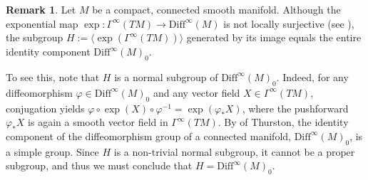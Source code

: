 \documentclass[11pt,reqno]{amsart}
\theoremstyle{definition}
\newtheorem{remark}[theorem]{Remark}
\numberwithin{equation}{section}
\begin{document}
\begin{remark}
Let $M$ be a compact, connected smooth manifold. Although the exponential map $\exp: \Gamma^\infty(TM) \to \mathrm{Diff}^\infty(M)$ is not locally surjective (see \cite[p. 9]{25}), the subgroup $H := \langle \exp(\Gamma^\infty(TM)) \rangle$ generated by its image equals the entire identity component $\mathrm{Diff}^\infty(M)_0$. 

To see this, note that $H$ is a normal subgroup of $\mathrm{Diff}^\infty(M)_0$. Indeed, for any diffeomorphism $\varphi \in \mathrm{Diff}^\infty(M)_0$ and any vector field $X \in \Gamma^\infty(TM)$, conjugation yields $\varphi \circ \exp(X) \circ \varphi^{-1} = \exp(\varphi_* X)$, where the pushforward $\varphi_* X$ is again a smooth vector field in $\Gamma^\infty(TM)$. By \cite[Theorem 1]{38} of Thurston, the identity component of the diffeomorphism group of a connected manifold, $\mathrm{Diff}^\infty(M)_0$, is a simple group. Since $H$ is a non-trivial normal subgroup, it cannot be a proper subgroup, and thus we must conclude that $H = \mathrm{Diff}^\infty(M)_0$.
\end{remark}
\end{document}
